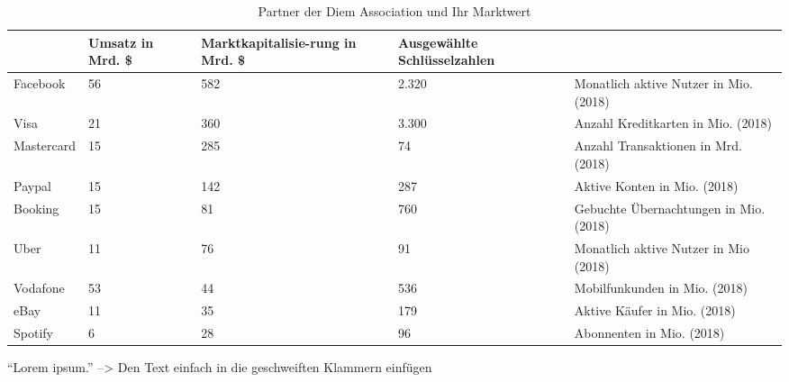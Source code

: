 \begin{table}[H]
    \centering
    {\footnotesize
        \begin{tabularx}{\textwidth}{|l|p{}|p{}|p{}|X|}
            \hline
                       & Umsatz in Mrd. \$ & Marktkapitalisie-rung in Mrd. \$ & Ausgewählte Schlüsselzahlen &                                        \\
            \hline
            Facebook   & 56                & 582                              & 2.320                       & Monatlich aktive Nutzer in Mio. (2018) \\
            \hline
            Visa       & 21                & 360                              & 3.300                       & Anzahl Kreditkarten in Mio. (2018)     \\
            \hline
            Mastercard & 15                & 285                              & 74                          & Anzahl Transaktionen in Mrd. (2018)    \\
            \hline
            Paypal     & 15                & 142                              & 287                         & Aktive Konten in Mio. (2018)           \\
            \hline
            Booking    & 15                & 81                               & 760                         & Gebuchte Übernachtungen in Mio. (2018) \\
            \hline
            Uber       & 11                & 76                               & 91                          & Monatlich aktive Nutzer in Mio (2018)  \\
            \hline
            Vodafone   & 53                & 44                               & 536                         & Mobilfunkunden in Mio. (2018)          \\
            \hline
            eBay       & 11                & 35                               & 179                         & Aktive Käufer in Mio. (2018)           \\
            \hline
            Spotify    & 6                 & 28                               & 96                          & Abonnenten in Mio. (2018)              \\
            \hline
        \end{tabularx}
    }
    \caption{Partner der Diem Association und Ihr Marktwert \cite{libra.das.globale.finanzsystem}}
    \label{tab:uebersicht_zusammensetzung}
\end{table}

\parencite[eg.][\psqq]{} %
\textcite[eg.][\psq]{} %

\autocite[eg.][\psq]{} %
\textcite[eg.][\psqq]{} %

\enquote{Lorem ipsum.} --> Den Text einfach in die geschweiften Klammern einfügen
